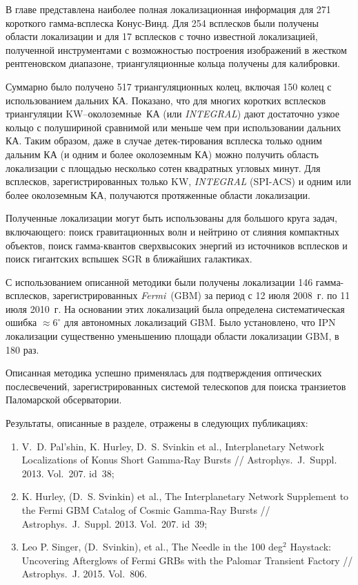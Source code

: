 В главе представлена наиболее полная локализационная информация для 271 короткого 
гамма-всплеска Конус-Винд. Для 254 всплесков были получены области локализации и 
для 17 всплесков с точно известной локализацией, полученной инструментами с 
возможностью построения изображений в жестком рентгеновском диапазоне, триангуляционные
кольца получены для калибровки.

Суммарно было получено 517 триангуляционных колец, включая 150 колец с использованием 
дальних КА. Показано, что для многих коротких всплесков триангуляции 
KW--околоземные~КА (или \textit{INTEGRAL}) дают достаточно узкое кольцо 
с полушириной сравнимой или меньше чем при использовании дальних КА. Таким образом, 
даже в случае детек-тирования всплеска только одним дальним КА (и одним и более 
околоземным КА) можно получить область локализации с площадью несколько 
сотен квадратных угловых минут. Для всплесков, зарегистрированных только KW, 
\textit{INTEGRAL} (SPI-ACS) и одним или более околоземным КА, получаются 
протяженные области локализации.

Полученные локализации могут быть использованы для большого круга задач, включающего: 
поиск гравитационных волн и нейтрино от слияния компактных объектов, 
поиск гамма-квантов сверхвысоких энергий из источников всплесков и поиск гигантских 
вспышек SGR в ближайших галактиках.

\FloatBarrier

С использованием описанной методики были получены локализации 146 гамма-всплесков,
зарегистрированных \textit{Fermi}~(GBM) за период с 12 июля 2008~г. по 11 июля 2010~г.
На основании этих локализаций была определена систематическая ошибка $\approx 6^\circ$
для автономных локализаций GBM. Было установлено, что IPN локализации 
существенно уменьшению площади области локализации GBM, в 180 раз.  

Описанная методика успешно применялась для подтверждения оптических послесвечений,
зарегистрированных системой телескопов для поиска транзиетов Паломарской обсерватории.

Результаты, описанные в разделе, отражены в следующих публикациях:
\begin{enumerate}
\item V.~D. Pal'shin, K. Hurley, D.~S. Svinkin et al., Interplanetary Network Localizations of
Konus Short Gamma-Ray Bursts // Astrophys.~J.~Suppl. 2013. Vol.~207. id~38;
\item K. Hurley, (D.~S. Svinkin) et al., The Interplanetary Network Supplement to 
the Fermi GBM Catalog of Cosmic Gamma-Ray Bursts // Astrophys.~J.~Suppl. 2013. Vol.~207. id~39;
\item Leo P. Singer, (D.~Svinkin), et al., The Needle in the 100 deg$^2$ Haystack: 
Uncovering Afterglows of Fermi GRBs with the Palomar Transient Factory // 
Astrophys.~J. 2015. Vol.~806.
\end{enumerate}


\clearpage